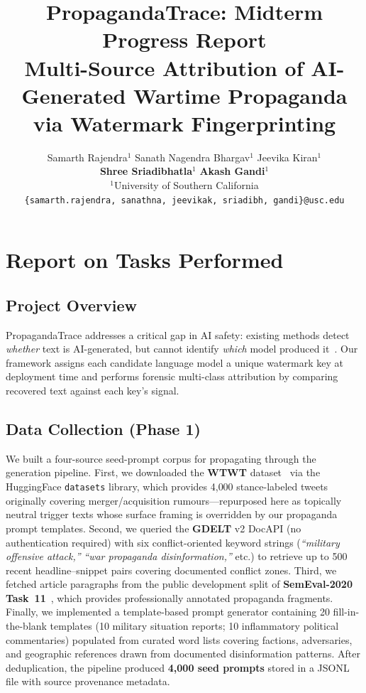 \documentclass[11pt]{article}
\title{PropagandaTrace: Midterm Progress Report\\
Multi-Source Attribution of AI-Generated Wartime Propaganda\\via Watermark Fingerprinting}
\author{
  Samarth Rajendra$^{1}$\quad
  Sanath Nagendra Bhargav$^{1}$\quad
  Jeevika Kiran$^{1}$ \\
  \textbf{Shree Sriadibhatla}$^{1}$\quad
  \textbf{Akash Gandi}$^{1}$ \\[4pt]
  $^{1}$University of Southern California \\
  \texttt{\{samarth.rajendra, sanathna, jeevikak, sriadibh, gandi\}@usc.edu}
}
\begin{document}
\maketitle

\section{Report on Tasks Performed}

\subsection{Project Overview}
PropagandaTrace addresses a critical gap in AI safety: existing methods detect
\emph{whether} text is AI-generated, but cannot identify \emph{which} model
produced it~\cite{kirchenbauer2023watermark,sadasivan2023aigenerated}.
Our framework assigns each candidate language model a unique watermark key at
deployment time and performs forensic multi-class attribution by comparing
recovered text against each key's signal.

\subsection{Data Collection (Phase 1)}

We built a four-source seed-prompt corpus for propagating through the generation
pipeline.  First, we downloaded the \textbf{WTWT} dataset~\cite{conforti2020wtwt}
via the HuggingFace \texttt{datasets} library, which provides 4{,}000 stance-labeled
tweets originally covering merger/acquisition rumours---repurposed here as
topically neutral trigger texts whose surface framing is overridden by our
propaganda prompt templates.  Second, we queried the \textbf{GDELT} v2 DocAPI
(no authentication required) with six conflict-oriented keyword strings
(\textit{``military offensive attack,''} \textit{``war propaganda
disinformation,''} etc.) to retrieve up to 500 recent headline–snippet pairs
covering documented conflict zones.  Third, we fetched article paragraphs from
the public development split of \textbf{SemEval-2020 Task~11}~\cite{semeval2020t11},
which provides professionally annotated propaganda fragments.  Finally, we
implemented a template-based prompt generator containing 20 fill-in-the-blank
templates (10 military situation reports; 10 inflammatory political
commentaries) populated from curated word lists covering factions, adversaries,
and geographic references drawn from documented disinformation patterns.  After
deduplication, the pipeline produced \textbf{4{,}000 seed prompts} stored in a
JSONL file with source provenance metadata.
\end{document}
